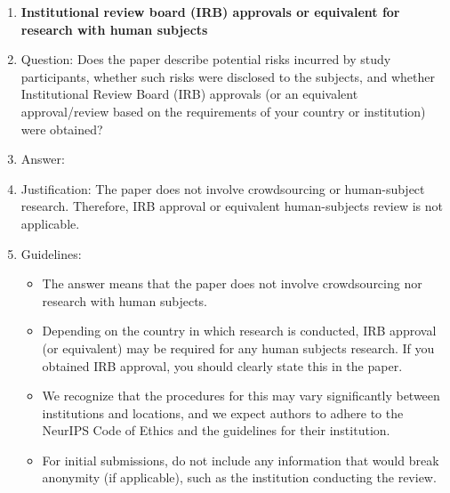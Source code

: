 \begin{enumerate}
\item {\bf Institutional review board (IRB) approvals or equivalent for research with human subjects}
    \item[] Question: Does the paper describe potential risks incurred by study participants, whether such risks were disclosed to the subjects, and whether Institutional Review Board (IRB) approvals (or an equivalent approval/review based on the requirements of your country or institution) were obtained?
    \item[] Answer: \answerNA{}
    \item[] Justification: The paper does not involve crowdsourcing or human-subject research. Therefore, IRB approval or equivalent human-subjects review is not applicable.
    \item[] Guidelines:
    \begin{itemize}
        \item The answer \answerNA{} means that the paper does not involve crowdsourcing nor research with human subjects.
        \item Depending on the country in which research is conducted, IRB approval (or equivalent) may be required for any human subjects research. If you obtained IRB approval, you should clearly state this in the paper. 
        \item We recognize that the procedures for this may vary significantly between institutions and locations, and we expect authors to adhere to the NeurIPS Code of Ethics and the guidelines for their institution. 
        \item For initial submissions, do not include any information that would break anonymity (if applicable), such as the institution conducting the review.
    \end{itemize}


\end{enumerate}
